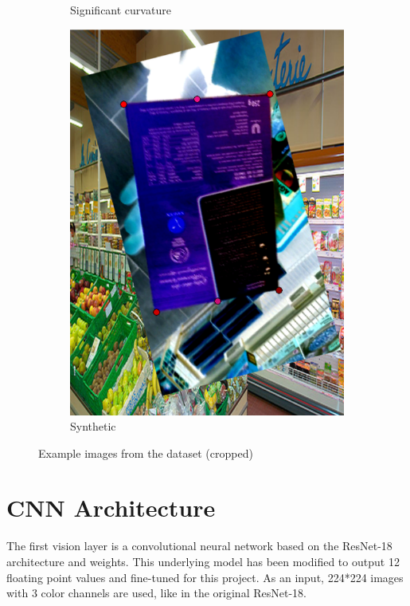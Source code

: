 \documentclass[a4paper,11pt]{report}
\begin{document}
\begin{figure}[h]
\begin{subfigure}{0.45\textwidth}
                        \caption{Significant curvature}
                        \label{fig:full_image_example_1}
                    \end{subfigure}
                    \hfill
                    \begin{subfigure}{0.45\textwidth}
                        \centering
                        \includegraphics[width=\textwidth]{synthetic_image_example_1.png}
                        \caption{Synthetic}
                        \label{fig:synthetic_image_example_1}
                    \end{subfigure}
                    \caption{Example images from the dataset (cropped)}
                    \label{fig:subsection-examples}
                \end{figure}
                 
    
        \section{CNN Architecture}
            The first vision layer is a convolutional neural network based on the ResNet-18 \cite{he2015deepresiduallearningimage} architecture and weights. This underlying model has been modified to output 12 floating point values and fine-tuned for this project. As an input, 224*224 images with 3 color channels are used, like in the original ResNet-18. 
            
\end{document}
